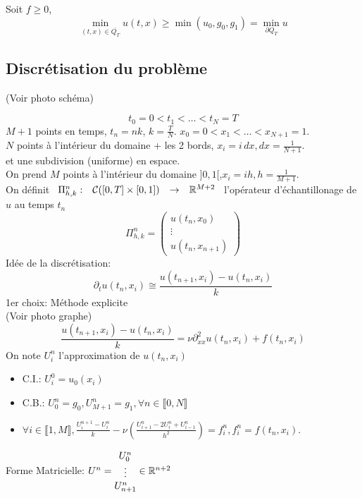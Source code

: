 \documentclass[]{report}
\begin{document}
    \begin{lm}{}{}
        Soit $f\ge 0$,
        \[\min_{(t,x)\in \overline{Q_T}} u(t,x)\ge \min(u_0,g_0,g_1)=\min_{\partial Q_T}u\]
    \end{lm}

    \subsection{Discrétisation du problème}

    (Voir photo schéma)

    \[t_0=0<t_1<\ldots<t_N=T\]
    $M+1$ points en temps, $t_n= nk $, $k=\frac{T}{N}$. $x_0=0<x_1<\ldots<x_{N+1}=1$.\\
    $N$ points à l'intérieur du domaine + les 2 bords, $x_i=i\, dx,dx=\frac{1}{N+1}$.\\
    et une subdivision (uniforme) en espace.\\
    On prend $M$ points à l'intérieur du domaine $]0,1[$,$x_i=ih,h=\frac{1}{M+1}$.\\
    On définit $\begin{array}{ccccc} \Pi^n_{h,k} : & \mathcal{C}([0,T]\times [0,1]) & \to & \mathbb{R}^{M+2} \end{array}$ l'opérateur d'échantillonage de $u$ au temps $t_n$
    \[\Pi^n_{h,k}=\left(\begin{matrix}
        u(t_n,x_0)\\
        \vdots\\
        u(t_n,x_{n+1})
    \end{matrix}\right)\]
    Idée de la discrétisation:
    \[\partial_t u(t_n,x_i)\cong\frac{u(t_{n+1},x_i)-u(t_n,x_i)}{k}\]
    1er choix: Méthode explicite\\
    (Voir photo graphe)
    \[\frac{u(t_{n+1},x_i)-u(t_n,x_i)}{k}=\nu \partial_{xx}^2u(t_n,x_i)+f(t_n,x_i)\]
    On note $U_i^n$ l'approximation de $u(t_n,x_i)$
    \begin{itemize}
        \item C.I.: $U_i^0=u_0(x_i)$
        \item C.B.: $U_0^n=g_0,U_{M+1}^n=g_1,\forall n\in \llbracket 0,N\rrbracket$
        \item $\forall i\in \llbracket 1,M\rrbracket,\frac{U_i^{n+1}-U_i^n}{k}-\nu\left(\frac{U_{i+1}^n-2U_i^n+U_{i-1}^n}{h^2}\right)=f_i^n,f_i^n=f(t_n,x_i)$.
    \end{itemize}
    Forme Matricielle: $U^n=\begin{matrix}
        U_0^n\\
        \vdots\\
        U_{n+1}^n
    \end{matrix}\in \mathbb{R}^{n+2}$
\end{document}
